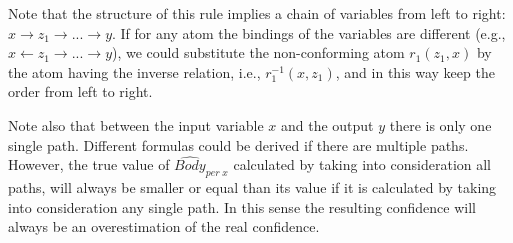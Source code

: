 {Note that the structure of this rule implies a chain of variables from left to right: $x \rightarrow z_1 \rightarrow ... \rightarrow y$.
If for any atom the bindings of the variables are different (e.g., $x \leftarrow z_1 \rightarrow ... \rightarrow y$),
we could substitute the non-conforming atom $r_1(z_1,x)$ by the atom having the inverse relation, i.e., $r_1^{-1}(x,z_1)$, and in this way keep the order from left to right.

Note also that between the input variable $x$ and the output $y$ there is only one single path.
Different formulas could be derived if there are multiple paths.
However, the true value of $ \widehat {Body}_{per\; x} $  calculated by taking into consideration all paths, will always be smaller or equal than its value if it is calculated by taking into consideration any single path.
In this sense the resulting confidence will always be an overestimation of the real confidence.
}


